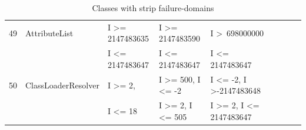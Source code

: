 \begin{table}[h]
{{\begin{tabular}{|l|l|l|l|l|l|l|l|l|}
49	& AttributeList				& I \textgreater= 2147483635				& I \textgreater= 2147483590			& I \textgreater~698000000					\\ 
	&                                             & I \textless= 2147483647					& I \textless= 2147483647				& I \textless= 2147483647 					\\
50	& ClassLoaderResolver		&  I \textgreater= 2,						       & I \textgreater= 500, I \textless= -2			& I \textless= -2, I \textgreater -2147483648  								  \\ 
	&                                             &  I \textless= 18						       & I \textgreater= 2, I \textless= 505			& I \textgreater= 2, I \textless= 2147483647			   					  \\
	

\hline
\end{tabular}
}
}
\bigskip
\caption{Classes with strip failure-domains}
\label{table:stripDomains}
\end{table}

















\begin{table}[h]
\centering
\noindent{}
\bigskip
\caption{Classes with point failure-domains}
\label{table:pointDomains}
\end{table}




